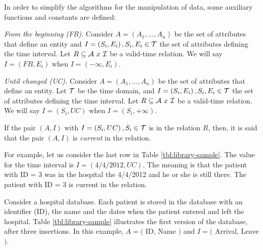 In order to simplify the algorithms for the manipulation of data, some auxiliary functions and constants are defined:


\begin{definition}
 \label{def:from-beginning}
\emph{From the beginning (FB).} 
Consider $A=\left(A_1, \ldots, A_n \right)$ be the set of attributes that define an entity and $I = \left(S_i, E_i \right), S_i, E_i \in \mathcal{T}$ the set of attributes defining the time interval. Let $R \subseteq \mathcal{A}\  x\  \mathcal{I}$ be a valid-time relation. We will say $I = \left(FB, E_i \right)$ when $I = \left(- \infty, E_i \right)$.
\end{definition}

\begin{definition}
 \label{def:until-changed}
\emph{Until changed (UC).} 
Consider $A=\left(A_1, \ldots, A_n \right)$ be the set of attributes that define an entity. Let $\mathcal{T}$ be the time domain, and $I = \left(S_i, E_i \right), S_i, E_i \in \mathcal{T}$ the set of attributes defining the time interval. Let $R \subseteq \mathcal{A}\  x\  \mathcal{I}$ be a valid-time relation. We will say  $I = \left(S_i, UC \right)$ when $I = \left(S_i, +\infty \right)$.
\end{definition}

If the pair $\left(A, I \right)$ with $I = \left(S_i, UC \right), S_i \in \mathcal{T}$ is in the relation $R$, then, it is said that the pair $\left(A, I \right)$ is \emph{current} in the relation.

For example, let us consider the last row in Table \ref{tbl:library-sample}. The value for the time interval is $I = \left(4/4/2012 , UC \right)$. The meaning is that the patient with ID = 3 was in the hospital the  4/4/2012 and he or she is still there. The patient with ID = 3 is current in the relation.


\begin{example}
\label{ex:library-database}
 Consider a hospital database. Each patient is stored in the database with an identifier (ID), the name and the dates when the patient entered and left the hospital. Table \ref{tbl:library-sample} illustrates the first version of the database, after three insertions. In this example, $A = ($ ID, Name $)$ and $I = ($ Arrival, Leave $)$.
\end{example}

